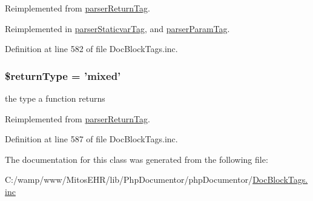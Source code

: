 \-Reimplemented from \hyperlink{classparser_return_tag_a4a925d6b38bcf3957c713a7d3dc7da1f}{parser\-Return\-Tag}.



\-Reimplemented in \hyperlink{classparser_staticvar_tag_a4a925d6b38bcf3957c713a7d3dc7da1f}{parser\-Staticvar\-Tag}, and \hyperlink{classparser_param_tag_a4a925d6b38bcf3957c713a7d3dc7da1f}{parser\-Param\-Tag}.



\-Definition at line 582 of file \-Doc\-Block\-Tags.\-inc.

\hypertarget{classparser_var_tag_a0f317c2c1d4c617554890223a39037be}{
\subsubsection[{\$return\-Type}]{\setlength{\rightskip}{0pt plus 5cm}\$return\-Type = 'mixed'}}\label{classparser_var_tag_a0f317c2c1d4c617554890223a39037be}
the type a function returns 

\-Reimplemented from \hyperlink{classparser_return_tag_a0f317c2c1d4c617554890223a39037be}{parser\-Return\-Tag}.



\-Definition at line 587 of file \-Doc\-Block\-Tags.\-inc.



\-The documentation for this class was generated from the following file\-:\begin{DoxyCompactItemize}
\item 
\-C\-:/wamp/www/\-Mitos\-E\-H\-R/lib/\-Php\-Documentor/php\-Documentor/\hyperlink{_doc_block_tags_8inc}{\-Doc\-Block\-Tags.\-inc}\end{DoxyCompactItemize}
